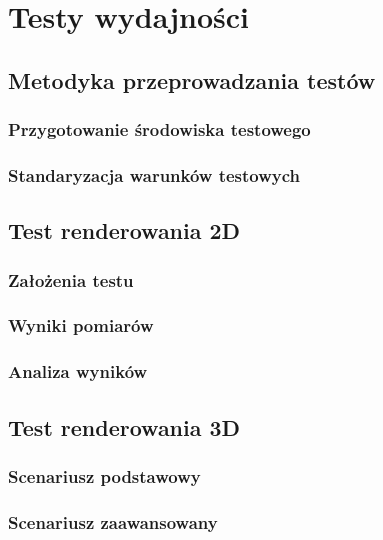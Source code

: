 \clearpage
\section{Testy wydajności}

\subsection{Metodyka przeprowadzania testów}
\subsubsection{Przygotowanie środowiska testowego}

\subsubsection{Standaryzacja warunków testowych}

\subsection{Test renderowania 2D}
\subsubsection{Założenia testu}

\subsubsection{Wyniki pomiarów}

\subsubsection{Analiza wyników}

\subsection{Test renderowania 3D}
\subsubsection{Scenariusz podstawowy}

\subsubsection{Scenariusz zaawansowany}

